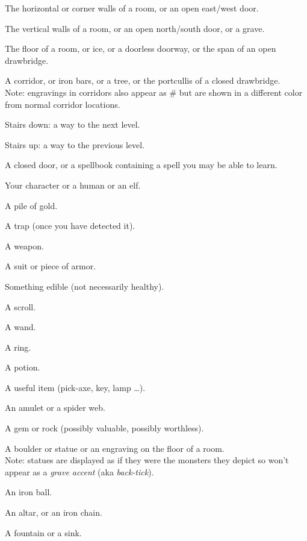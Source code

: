 \documentclass[titlepage]{article}
\begin{document}
\begin{description}[font=\mdseries\ttfamily]
\item[-]
The horizontal or corner walls of a room, or an open east/west door.
\item[|]
The vertical walls of a room, or an open north/south door, or a grave.
\item[.]
The floor of a room, or ice, or a doorless doorway, or the span of an
open drawbridge.
\item[\#]
A corridor, or iron bars, or a tree, or the portcullis of a closed
drawbridge.\\
Note: engravings in corridors also appear as \# but are shown in
a different color from normal corridor locations.
\item[>]
Stairs down: a way to the next level.
\item[<]
Stairs up: a way to the previous level.
\item[+]
A closed door, or a spellbook containing a spell you may be able to learn.
\item[@]
Your character or a human or an elf.
\item[\textdollar]
A pile of gold.
\item[\textasciicircum]
A trap (once you have detected it).
\item[)]
A weapon.
\item[{[}]
A suit or piece of armor.
\item[\%]
Something edible (not necessarily healthy).
\item[?]
A scroll.
\item[/]
A wand.
\item[=]
A ring.
\item[!]
A potion.
\item[(]
A useful item (pick-axe, key, lamp \ldots).
\item["]
An amulet or a spider web.
\item[*]
A gem or rock (possibly valuable, possibly worthless).
\item[\textasciigrave]
A boulder or statue or an engraving on the floor of a room.\\
Note: statues are displayed as if they were the monsters they depict
so won't appear as a \textit{grave accent} (aka \textit{back-tick}).
\item[0]
An iron ball.
\item[\textunderscore]
An altar, or an iron chain.
\item[\textbraceleft]
A fountain or a sink.
\item[\textbraceright]

\end{description}
\end{document}
